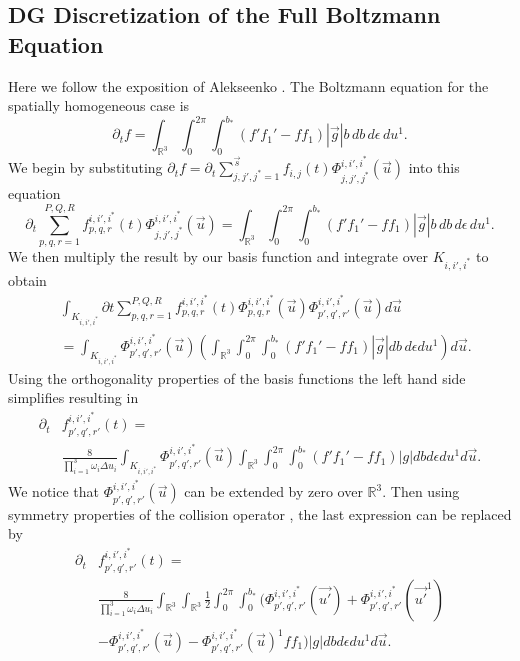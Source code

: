 \subsection{DG Discretization of the Full Boltzmann Equation}
Here we follow the exposition of Alekseenko \cite{alex}. The Boltzmann equation for the spatially homogeneous case is
%
\begin{equation*}
\partial_t f = \int_{\mathbb{R}^3} \int_0^{2 \pi} \int_0^{b_*} \left( f' f_1' - f f_1 \right) |\vec{g}| b \, d b \, d \epsilon \, du^1.
\end{equation*}
%
We begin by substituting $\partial_t f = \partial_t \sum_{j,j',j^*=1}^{\vec{s}} f_{i,j}(t) \Phi_{j,j',j^*}^{i,i',i^*}(\vec{u})$ into this equation
%
\begin{equation}
\label{123}
\partial_t \sum_{p,q,r=1}^{P,Q,R} f_{p,q,r}^{i,i',i^*}(t) \Phi_{j,j',j^*}^{i,i',i^*}(\vec{u}) = \int_{\mathbb{R}^3} \int_0^{2 \pi} \int_0^{b_*} \left( f' f_1' - f f_1 \right) |\vec{g}|b \, db \, d\epsilon \, du^1.
\end{equation}
%
We then multiply the result by our basis function and integrate over $K_{i,i',i^*}$ to obtain
%
\begin{align*}
&\int_{K_{i,i',i^*}} \partial t \sum_{p,q,r = 1}^{P,Q,R} f^{i,i',i^*}_{p,q,r}(t) \Phi^{i,i',i^*}_{p,q,r}(\vec{u}) \Phi^{i,i',i^*}_{p',q',r'}(\vec{u}) d\vec{u}\\
&= \int_{K_{i,i',i^*}} \Phi^{i,i',i^*}_{p',q',r'}(\vec{u}) \left( \int_{\mathbb{R}^3} \int_0^{2 \pi} \int_0^{b_*} \left( f' f_1' - f f_1 \right) |\vec{g}| db \, d \epsilon du^1 \right) d\vec{u}.
\end{align*}
%
Using the orthogonality properties of the basis functions the left hand side simplifies resulting in 
%
\begin{align*}
\partial_t & f_{p',q',r'}^{i,i',i^*}(t) = \nonumber \\
& \frac{8}{\prod_{i=1}^3 \omega_i \Delta u_i} \int_{K_{i,i',i^*}} \Phi^{i,i',i^*}_{p',q',r'}(\vec{u}) \int_{\mathbb{R}^3} \int_0^{2 \pi} \int_0^{b_*} \left( f' f_1' - f f_1 \right) |g| d b d \epsilon du^1 d\vec{u}.
\end{align*}
%
We notice that $\Phi^{i,i',i^*}_{p',q',r'}(\vec{u})$ can be extended by zero over $\mathbb{R}^3$. Then using symmetry properties of the collision operator \cite{kogan}, the last expression can be replaced by
%
\begin{equation}
\label{28}
\begin{aligned}
\partial_t & f_{p',q',r'}^{i,i',i^*}(t) = \\
& \frac{8}{\prod_{i=1}^3 \omega_i \Delta u_i}\int_{\mathbb{R}^3} \int_{\mathbb{R}^3} \frac{1}{2} \int_0^{2 \pi} \int_0^{b_*} (\Phi^{i,i',i^*}_{p',q',r'}(\vec{u'}) + \Phi^{i,i',i^*}_{p',q',r'}(\vec{u'}^1)\\
& - \Phi^{i,i',i^*}_{p',q',r'}(\vec{u}) - \Phi^{i,i',i^*}_{p',q',r'}(\vec{u})^1 f f_1 ) |g| d b d \epsilon du^1 d\vec{u}.
\end{aligned}
\end{equation}
